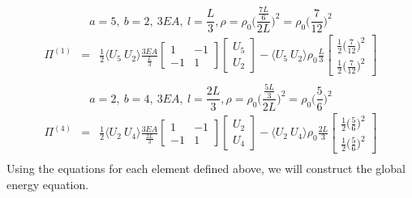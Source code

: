 \documentclass[a4paper]{article}
\begin{document}
$$a = 5, \ b = 2, \ 3EA, \ l = \frac{L}{3}, \rho = \rho_{0}\Big(\frac{\frac{7L}{6}}{2L}\Big)^{2} = \rho_{0}\Big(\frac{7}{12}\Big)^{2}$$
\begin{eqnarray*}
\Pi^{(1)} & = & \frac{1}{2} \langle U_{5} \ U_{2} \rangle \frac{3EA}{\frac{L}{3}}
\begin{bmatrix}
1 & -1 \\
-1 & 1
\end{bmatrix}  \begin{bmatrix}
U_{5} \\ 
U_{2}
\end{bmatrix} - \langle U_{5} \ U_{2} \rangle \rho_{0}\frac{L}{3} 
\begin{bmatrix}
\frac{1}{2}\Big(\frac{7}{12}\Big)^{2} \\
\frac{1}{2}\Big(\frac{7}{12}\Big)^{2}
\end{bmatrix} \\
\end{eqnarray*}
$$a = 2, \ b = 4, \ 3EA, \ l = \frac{2L}{3}, \rho = \rho_{0}\Big(\frac{\frac{5L}{3}}{2L}\Big)^{2} = \rho_{0}\Big(\frac{5}{6}\Big)^{2}$$
\begin{eqnarray*}
\Pi^{(4)} & = & \frac{1}{2} \langle U_{2} \ U_{4} \rangle \frac{3EA}{\frac{2L}{3}}
\begin{bmatrix}
1 & -1 \\
-1 & 1
\end{bmatrix}  \begin{bmatrix}
U_{2} \\ 
U_{4}
\end{bmatrix} - \langle U_{2} \ U_{4} \rangle \rho_{0}\frac{2L}{3} 
\begin{bmatrix}
\frac{1}{2}\Big(\frac{5}{6}\Big)^{2} \\
\frac{1}{2}\Big(\frac{5}{6}\Big)^{2}
\end{bmatrix} \\
\end{eqnarray*}
Using the equations for each element defined above, we will construct the global energy equation.
\end{document}
